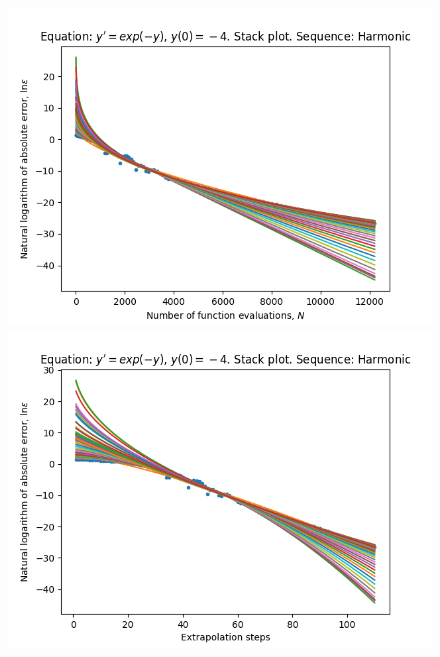 \begin{figure}[H]
\centering
\begin{minipage}{0.45\textwidth}
\centering
\includegraphics[scale=0.45]{../results/emr_plots/ln_em4_hp_harmonic_stack.png}
\end{minipage}
\begin{minipage}{0.45\textwidth}
\centering
\includegraphics[scale=0.45]{../results/emr_plots/ln_em4_hp_harmonic_steps_stack.png}
\end{minipage}
\end{figure}


